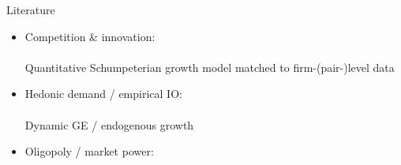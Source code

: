 \documentclass[
  10pt,               %
  aspectratio=169,     %
]{beamer}
\theoremstyle{plain}
\begin{document}
\begin{frame}{Literature}
  \begin{itemize}
    \item Competition \& innovation: \\
          {\footnotesize\citet{d-Aspremont1988-je,Aghion2001-yc,Aghion2005-vw,Acemoglu2012-bj,Aghion2013-nq,Bloom2013-pn,Lopez2019-sl,Peters2020-sd,Akcigit2021-ns,Akcigit2023-zl,Liu2022-iw,Cavenaile2023-lo}}\\
          \textcolor{uclaBlue}{Quantitative Schumpeterian growth model matched to firm-(pair-)level
            data}
    \item Hedonic demand / empirical IO: \\
          {\footnotesize\citet{Lancaster1966-sg,Rosen1974-ep,Epple1987-ru,Berry1995-lx,Nevo2001-ja,Pellegrino2024-dn}}\\
          \textcolor{uclaBlue}{Dynamic GE / endogenous growth}
    \item Oligopoly / market power: \\
          {\footnotesize\citet{Neary2003-sn,Atkeson2008-zc,Gutierrez2017-wl,Autor2020-mr,Baqaee2020-eb,De_Loecker2020-jn,Azar2021-uh,Edmond2023-bg}}{\footnotesize\par}
  \end{itemize}
\end{frame}
\end{document}
